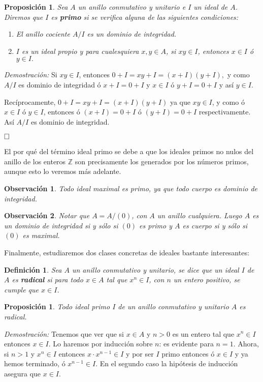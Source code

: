 \documentclass[12pt]{article}
\newtheorem{proposition}[theorem]{Proposición}
\newtheorem{definition}[theorem]{Definición}
\newtheorem{observation}{Observación}[theorem]
\begin{document}
\begin{proposition} Sea $A$ un anillo conmutativo y unitario e $I$ un ideal de $A$. Diremos que $I$ es \textbf{primo} si se verifica alguna de las siguientes condiciones: \begin{enumerate}
\item El anillo cociente $A/I$ es un dominio de integridad.
\item $I$ es un ideal propio y para cualesquiera $x, y \in A$, si $xy \in I$, entonces $x \in I$ ó $y \in I.$
\end{enumerate}
\end{proposition}
\emph{Demostración: } Si $xy \in I$, entonces $0 + I = xy + I = (x + I)(y + I),$ y como $A/I$ es dominio de integridad ó $x + I = 0 + I$ y $x \in I$ ó $y + I = 0 + I$ y así $y \in I$.

Recíprocamente, $0 + I = xy + I = (x+ I)( y + I)$ ya que $xy \in I$, y como ó $x \in I$ ó $y \in I$, entonces ó $(x + I)=  0 + I$ ó $(y + I) = 0 + I$ respectivamente. Así $A/I$ es dominio de integridad.

$\hfill \square$

El por qué del término ideal primo se debe a que los ideales primos no nulos del anillo de los enteros $\mathbb{Z}$ son precisamente los generados por los números primos, aunque esto lo veremos más adelante.

\begin{observation} Todo ideal maximal es primo, ya que todo cuerpo es dominio de integridad.
\end{observation}

\begin{observation} Notar que $A = A/(0)$, con $A$ un anillo cualquiera. Luego $A$ es un dominio de integridad si y sólo si $(0)$ es primo y $A$ es cuerpo si y sólo si $(0)$ es maximal.
\end{observation}

Finalmente, estudiaremos dos clases concretas de ideales bastante interesantes: 

\begin{definition}Sea $A$ un anillo conmutativo y unitario, se dice que un ideal $I$ de $A$ es \textbf{radical} si para todo $x \in A$ tal que $x^n \in I$, con $n$ un entero positivo, se cumple que $x \in I$.
\end{definition}

\begin{proposition}Todo ideal primo $I$ de un anillo conmutativo y unitario $A$ es radical.
\end{proposition}
\emph{Demostración: }Tenemos que ver que si $x \in A$ y $n>0$ es un entero tal que $x^n \in I$ entonces $x \in I$. Lo haremos por inducción sobre $n$: es evidente para $n=1$. Ahora, si $n>1$ y $x^n \in I$ entonces $x \cdot x^{n-1} \in I$ y por ser $I$ primo entonces ó $x \in I$ y ya hemos terminado, ó $x^{n-1} \in I$. En el segundo caso la hipótesis de inducción asegura que $x \in I$.
\end{document}
